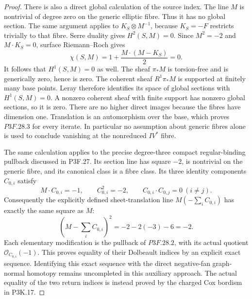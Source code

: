 \begin{proof}
There is also a direct global calculation of the source index. The line \(M\) is nontrivial of degree zero on the generic elliptic fibre. Thus it has no global section. The same argument applies to \(K_S\otimes M^{-1}\), because \(K_S=-F\) restricts trivially to that fibre. Serre duality gives \(H^2(S,M)=0\). Since \(M^2=-2\) and \(M\cdot K_S=0\), surface Riemann--Roch gives \[
 \chi(S,M)=1+\frac{M\cdot(M-K_S)}2=0.
\] It follows that \(H^1(S,M)=0\) as well. The sheaf \(\pi_*M\) is torsion-free and is generically zero, hence is zero. The coherent sheaf \(R^1\pi_*M\) is supported at finitely many base points. Leray therefore identifies its space of global sections with \(H^1(S,M)=0\). A nonzero coherent sheaf with finite support has nonzero global sections, so it is zero. There are no higher direct images because the fibres have dimension one. Translation is an automorphism over the base, which proves \(P3F.28.3\) for every iterate. In particular no assumption about generic fibres alone is used to conclude vanishing at the nonreduced \(IV^*\) fibre.

The same calculation applies to the precise degree-three compact regular-binding pullback discussed in P3F.27. Its section line has square \(-2\), is nontrivial on the generic fibre, and its canonical class is a fibre class. Its three identity components \(C_{0,i}\) satisfy \[
 M\cdot C_{0,i}=-1,\qquad C_{0,i}^2=-2,
 \qquad C_{0,i}\cdot C_{0,j}=0\ (i\ne j).
\] Consequently the explicitly defined sheet-translation line \(M(-\sum_iC_{0,i})\) has exactly the same square as \(M\): \[
 \left(M-\sum_iC_{0,i}\right)^2
 =-2-2(-3)-6=-2.
\] Each elementary modification is the pullback of \(P3F.28.2\), with its actual quotient \(\mathcal O_{C_{0,i}}(-1)\). This proves equality of their Dolbeault indices by an explicit exact sequence. Identifying this exact sequence with the direct negative-fan graph-normal homotopy remains uncompleted in this auxiliary approach. The actual equality of the two return indices is instead proved by the charged Cox bordism in P3K.17.
\end{proof}
